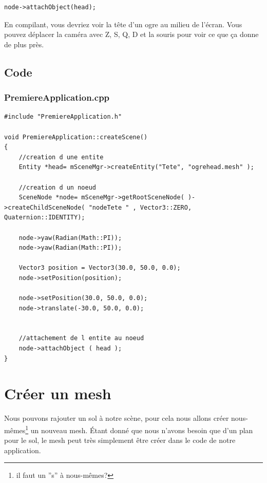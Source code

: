 \documentclass[10pt,a4paper]{report}
\begin{document}
\begin{lstlisting}
node->attachObject(head);
\end{lstlisting}

En compilant, vous devriez voir la t\^ete d'un ogre au milieu de l'\'ecran. Vous pouvez d\'eplacer la cam\'era avec Z, S, Q, D et la souris pour voir ce que \c{c}a donne de plus pr\`es.



\subsection{Code}

\subsubsection{PremiereApplication.cpp}
\begin{lstlisting}[caption={PremiereApplication.cpp: Instanciation d'entit\'e}]
#include "PremiereApplication.h"

void PremiereApplication::createScene()
{
    //creation d une entite
    Entity *head= mSceneMgr->createEntity("Tete", "ogrehead.mesh" );
    
    //creation d un noeud
    SceneNode *node= mSceneMgr->getRootSceneNode( )->createChildSceneNode( "nodeTete " , Vector3::ZERO, Quaternion::IDENTITY);
    
    node->yaw(Radian(Math::PI));
    node->yaw(Radian(Math::PI));

    Vector3 position = Vector3(30.0, 50.0, 0.0);
    node->setPosition(position);

    node->setPosition(30.0, 50.0, 0.0); 
    node->translate(-30.0, 50.0, 0.0); 
    
    
    //attachement de l entite au noeud
    node->attachObject ( head );
}
\end{lstlisting}








\section{Cr\'eer un mesh}

Nous pouvons rajouter un sol \`{a} notre sc\`ene, pour cela nous allons cr\'eer nous-m\^emes\footnote{il faut un ''s'' \`a  nous-m\^emes?} un nouveau mesh. \'Etant donn\'e que nous n'avons besoin que d'un plan pour le sol, le mesh peut tr\`es simplement \^etre cr\'eer dans le code de notre application.
\end{document}
